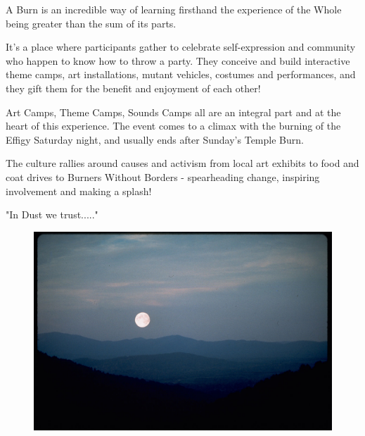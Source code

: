 A Burn is an incredible way of learning firsthand the experience of the Whole being greater than the sum of its parts.  

It's a place where participants gather to celebrate self-expression and community who happen to know how to throw a party.  They conceive and build interactive theme camps, art installations, mutant vehicles, costumes and performances, and they gift them for the benefit and enjoyment of each other!

Art Camps, Theme Camps, Sounds Camps all are an integral part and at the heart of this experience.  The event comes to a climax with the burning of the Effigy Saturday night, and usually ends after Sunday's Temple Burn. 

The culture rallies around causes and activism from local art exhibits to food and coat drives to Burners Without Borders - spearheading change, inspiring involvement and making a splash! 

"In Dust we trust....."


\vspace*{\fill}
\begin{figure}[!h]
\centering
\includegraphics[width=.9\textwidth]{images/ShenandoahMoon}
\label{image:mountainmoom}
\end{figure}
\vspace*{\fill}
